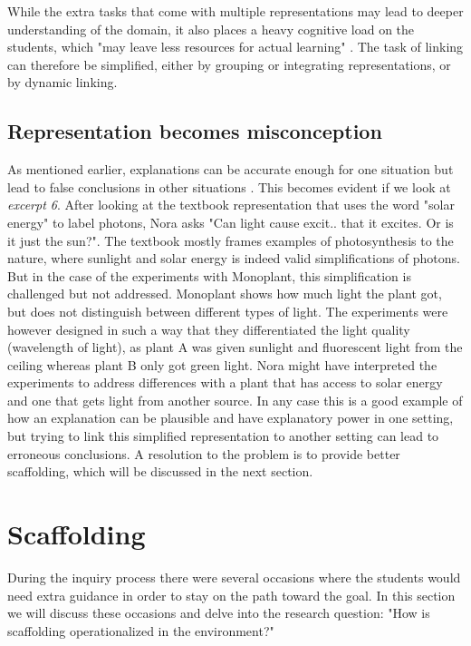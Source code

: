 While the extra tasks that come with multiple representations may lead to deeper understanding of the domain, it also places a heavy cognitive load on the students, which "may leave less resources for actual learning" \citetext{Sweller, 1988, 1989, referenced in \citealp{van2006supporting}, p. 200}. The task of linking can therefore be simplified, either by grouping or integrating representations, or by dynamic linking. 

\subsection{Representation becomes misconception}
As mentioned earlier, explanations can be accurate enough for one situation but lead to false conclusions in other situations \citep{smith1994misconceptions}. This becomes evident if we look at \emph{excerpt 6}. After looking at the textbook representation that uses the word "solar energy" to label photons, Nora asks "Can light cause excit.. that it excites. Or is it just the sun?". The textbook mostly frames examples of photosynthesis to the nature, where sunlight and solar energy is indeed valid simplifications of photons. But in the case of the experiments with Monoplant, this simplification is challenged but not addressed. Monoplant shows how much light the plant got, but does not distinguish between different types of light. The experiments were however designed in such a way that they differentiated the light quality (wavelength of light), as plant A was given sunlight and fluorescent light from the ceiling whereas plant B only got green light. Nora might have interpreted the experiments to address differences with a plant that has access to solar energy and one that gets light from another source. In any case this is a good example of how an explanation can be plausible and have explanatory power in one setting, but trying to link this simplified representation to another setting can lead to erroneous conclusions. A resolution to the problem is to provide better scaffolding, which will be discussed in the next section.

\section{Scaffolding}
During the inquiry process there were several occasions where the students would need extra guidance in order to stay on the path toward the goal. In this section we will discuss these occasions and delve into the research question: "How is scaffolding operationalized in the environment?"

